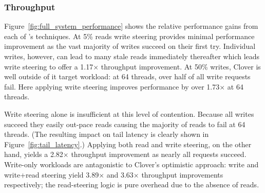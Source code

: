 \subsubsection{Throughput}

Figure~\ref{fig:full_system_performance} shows the relative
performance gains from each of \sword's techniques. At 5\% reads write
steering provides minimal performance improvement as the vast majority
of writes succeed on their first try. Individual writes, however, can
lead to many stale reads immediately thereafter which leads write steering
to offer a 1.17$\times$ throughput improvement.
%
%
At 50\% writes, Clover is well outside of it target workload:
at 64 threads, over half of all write requests fail. Here applying write
steering improves performance by over 1.73$\times$ at 64 threads.

Write steering alone is insufficient at this level of contention.
Because all writes succeed they easily out-pace reads causing the
majority of reads to fail at 64 threads.  (The resulting impact on
tail latency is clearly shown in Figure~\ref{fig:tail_latency}.)
Applying both read and write steering, on the other hand, yields a
2.82$\times$ throughput improvement as nearly all requests succeed.
%
%
Write-only workloads are antagonistic to Clover's optimistic
approach: write and write+read steering yield 3.89$\times$ and
3.63$\times$ throughput improvements respectively; the read-steering
logic is pure overhead due to the absence of reads.






